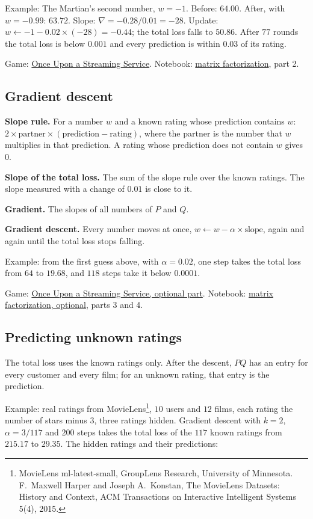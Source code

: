 \documentclass[11pt,a4paper]{article}
\newcommand{\term}[1]{\textbf{#1}}
\newcommand{\PartTwo}{\href{https://eth-ainit-hs26.github.io/AINIT-PAGE/viz/we2/matchmaker-part-2/}{Once Upon a Streaming Service}}
\newcommand{\Optional}{\href{https://eth-ainit-hs26.github.io/AINIT-PAGE/viz/we2/matchmaker-optional/}{Once Upon a Streaming Service, optional part}}
\newcommand{\NotebookMF}{\href{https://colab.research.google.com/github/eth-ainit-hs26/w2-cx-public/blob/main/02_cx_matrix_factorization_student.ipynb}{matrix factorization}}
\newcommand{\NotebookOpt}{\href{https://colab.research.google.com/github/eth-ainit-hs26/w2-cx-public/blob/main/02_cx_matrix_factorization_optional_student.ipynb}{matrix factorization, optional}}
\begin{document}
Example: The Martian's second number, $w = -1$. Before: $64.00$. After, with $w = -0.99$: $63.72$. Slope:
$\nabla = -0.28/0.01 = -28$. Update: $w \leftarrow -1 - 0.02 \times (-28) = -0.44$; the total loss falls to
$50.86$. After $77$ rounds the total loss is below $0.001$ and every prediction is within $0.03$ of its rating.

Game: \PartTwo. Notebook: \NotebookMF, part 2.

\subsection{Gradient descent}

\term{Slope rule.} For a number $w$ and a known rating whose prediction contains $w$:
$2 \times \text{partner} \times (\text{prediction} - \text{rating})$, where the partner is the number that $w$
multiplies in that prediction. A rating whose prediction does not contain $w$ gives $0$.

\term{Slope of the total loss.} The sum of the slope rule over the known ratings. The slope measured with a change
of $0.01$ is close to it.

\term{Gradient.} The slopes of all numbers of $P$ and $Q$.

\term{Gradient descent.} Every number moves at once, $w \leftarrow w - \alpha \times \text{slope}$, again and again
until the total loss stops falling.

Example: from the first guess above, with $\alpha = 0.02$, one step takes the total loss from $64$ to $19.68$, and
$118$ steps take it below $0.0001$.

Game: \Optional. Notebook: \NotebookOpt, parts 3 and 4.

\subsection{Predicting unknown ratings}

The total loss uses the known ratings only. After the descent, $PQ$ has an entry for every customer and every
film; for an unknown rating, that entry is the prediction.

Example: real ratings from MovieLens\footnote{MovieLens ml-latest-small, GroupLens Research, University of
Minnesota. F.~Maxwell Harper and Joseph A.~Konstan, The MovieLens Datasets: History and Context, ACM Transactions on
Interactive Intelligent Systems 5(4), 2015.}, $10$ users and $12$ films, each rating the number of stars minus 3,
three ratings hidden. Gradient descent with $k = 2$, $\alpha = 3/117$ and $200$ steps takes the total loss of the
$117$ known ratings from $215.17$ to $29.35$. The hidden ratings and their predictions:
\begin{center}

\end{center}
\end{document}
